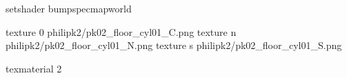 setshader bumpspecmapworld

texture 0 philipk2/pk02_floor_cyl01_C.png
texture n philipk2/pk02_floor_cyl01_N.png
texture s philipk2/pk02_floor_cyl01_S.png

texmaterial 2

